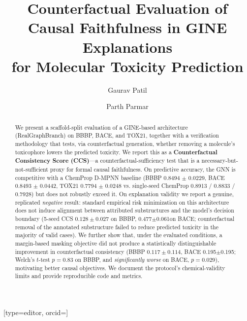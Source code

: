 \documentclass[a4paper,fleqn]{cas-dc}
\newcommand{\BBBPauc}{0.8494}
\newcommand{\BBBPaucsd}{0.0229}
\newcommand{\BACEauc}{0.8493}
\newcommand{\BACEaucsd}{0.0442}
\newcommand{\TOXauc}{0.7794}
\newcommand{\TOXaucsd}{0.0248}
\newcommand{\ChemBBBP}{0.8913}
\newcommand{\ChemBACE}{0.8833}
\newcommand{\ChemTOX}{0.7928}
\newcommand{\BACEcausalstd}{0.477}
\newcommand{\BACEcausalstdsd}{0.061} %
\newcommand{\BACEcausalreg}{0.195}
\newcommand{\BACEcausalregsd}{0.195} %
\begin{document}
\let\WriteBookmarks\relax
\def\floatpagepagefraction{1}
\def\textpagefraction{.001}

\title [mode = title]{Counterfactual Evaluation of Causal Faithfulness in GINE Explanations\\for Molecular Toxicity Prediction}

\author[1]{Gaurav Patil}[type=editor, orcid=]
\cormark[1]

\author[2]{Parth Parmar}




\begin{abstract}
We present a scaffold-split evaluation of a GINE-based architecture (RealGraphBranch) on BBBP, BACE, and TOX21, together with a verification methodology that tests, via counterfactual generation, whether removing a molecule's toxicophore lowers the predicted toxicity. We report this as a \textbf{Counterfactual Consistency Score (CCS)}---a counterfactual-sufficiency test that is a necessary-but-not-sufficient proxy for formal causal faithfulness.
On predictive accuracy, the GNN is competitive with a ChemProp D-MPNN baseline (BBBP \BBBPauc{} $\pm$ \BBBPaucsd, BACE \BACEauc{} $\pm$ \BACEaucsd, TOX21 \TOXauc{} $\pm$ \TOXaucsd{} vs. single-seed ChemProp \ChemBBBP{} / \ChemBACE{} / \ChemTOX) but does not robustly exceed it. On explanation validity we report a genuine, replicated \emph{negative} result: standard empirical risk minimization on this architecture does not induce alignment between attributed substructures and the model's decision boundary (5-seed CCS $0.128\pm0.027$ on BBBP, \BACEcausalstd$\pm$\BACEcausalstdsd on BACE; counterfactual removal of the annotated substructure failed to reduce predicted toxicity in the majority of valid cases). We further show that, under the evaluated conditions, a margin-based masking objective did not produce a statistically distinguishable improvement in counterfactual consistency (BBBP $0.117\pm0.114$, BACE \BACEcausalreg$\pm$\BACEcausalregsd; Welch's $t$-test $p=0.83$ on BBBP, and \emph{significantly worse} on BACE, $p=0.029$), motivating better causal objectives. We document the protocol's chemical-validity limits and provide reproducible code and metrics.
\end{abstract}
\end{document}
